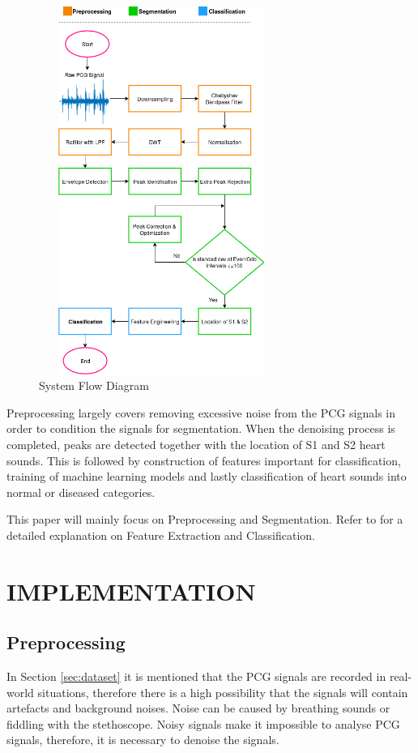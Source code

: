 \documentclass[10pt,twocolumn]{witseiepaper}
\begin{document}
\begin{figure}[h!]
    \centering
    \includegraphics[width=8cm, height=12cm]{reportFDfinal.png}
    \caption{System Flow Diagram}
    \label{fig:flow}
\end{figure}
Preprocessing largely covers removing excessive noise from the PCG signals in order to condition the signals for segmentation. When the denoising process is completed, peaks are detected together with the location of S1 and S2 heart sounds. This is followed by construction of features important for classification, training of machine learning models and lastly classification of heart sounds into normal or diseased categories.

This paper will mainly focus on Preprocessing and Segmentation. Refer to \cite{elias} for a detailed explanation on Feature Extraction and Classification.
\section{IMPLEMENTATION}

\subsection{Preprocessing}
In Section \ref{sec:dataset} it is mentioned that the PCG signals are recorded in real-world situations, therefore there is a high possibility that the signals will contain artefacts and background noises. Noise can be caused by breathing sounds or fiddling with the stethoscope. Noisy signals make it impossible to analyse PCG signals, therefore, it is necessary to denoise the signals.
\end{document}
